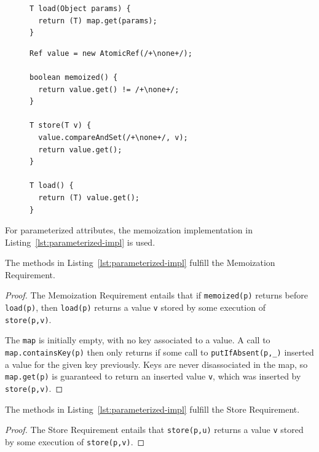 {\begin{figure}
\begin{minipage}[b]{.45\textwidth}
\begin{lstlisting}[basicstyle=\footnotesize\ttfamily,
  label={lst:parameterized-impl},
  caption={Memoization in Java for parameterized attributes.}]
T load(Object params) {
  return (T) map.get(params);
}
\end{lstlisting}
\end{minipage}%
\hfill%
\begin{minipage}[b]{.45\textwidth}
\begin{lstlisting}[basicstyle=\footnotesize\ttfamily,
  label={lst:nta-impl},
  caption={Memoization in Java for non-parameterized higher-order attributes.}]
Ref value = new AtomicRef(/+\none+/);

boolean memoized() {
  return value.get() != /+\none+/;
}

T store(T v) {
  value.compareAndSet(/+\none+/, v);
  return value.get();
}

T load() {
  return (T) value.get();
}
\end{lstlisting}
\end{minipage}
\end{figure}


For parameterized attributes, the memoization implementation in Listing~\ref{lst:parameterized-impl}
is used.

\begin{theorem}
  The methods in Listing~\ref{lst:parameterized-impl}
  fulfill the Memoization Requirement.
\end{theorem}

\begin{proof}
{\sloppy
  The Memoization Requirement entails that
  if \verb'memoized(p)' returns \true{} before \verb'load(p)', then \verb'load(p)' returns
  a value \verb'v' stored by some execution of \verb'store(p,v)'.

  The \verb'map' is initially empty, with no key associated to a value.
  A call to \verb'map.containsKey(p)' then only returns \true{} if some call
  to \verb'putIfAbsent(p,_)' inserted a value for the given key previously.
  Keys are never disassociated in the map, so \verb'map.get(p)' is guaranteed to
  return an inserted value \verb'v', which was inserted by \verb'store(p,v)'.
}
\end{proof}

\begin{theorem}
  The methods in Listing~\ref{lst:parameterized-impl}
  fulfill the Store Requirement.
\end{theorem}

\begin{proof}
  The Store Requirement entails that
  \verb'store(p,u)' returns a value \verb'v' stored by some execution of \verb'store(p,v)'.


\end{proof}}

